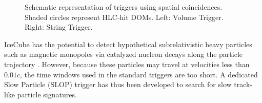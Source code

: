 \begin{figure}[ht]
  \centering {}
  \quad
  \caption{Schematic representation of triggers using spatial coincidences.  Shaded circles
    represent HLC-hit DOMs.  Left: Volume Trigger.  Right: String Trigger. }
\end{figure}

IceCube has the potential to detect hypothetical subrelativistic heavy
particles such as magnetic monopoles via catalyzed nucleon decays along
the particle trajectory \cite{Aartsen:2014awd}.  However, because these
particles may travel at velocities less than $0.01c$, the time
windows used in the standard triggers are too short.  A dedicated Slow
Particle (SLOP) trigger has thus been developed to search for slow
track-like particle signatures.

